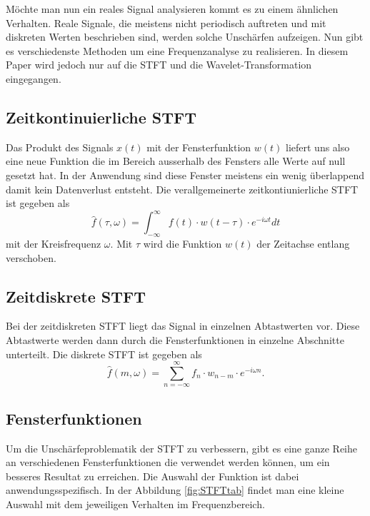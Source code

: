Möchte man nun ein reales Signal analysieren kommt es zu einem ähnlichen Verhalten. Reale Signale, die meistens nicht periodisch auftreten und mit diskreten Werten beschrieben sind, werden solche Unschärfen aufzeigen. Nun gibt es verschiedenste Methoden um eine Frequenzanalyse zu realisieren. In diesem Paper wird jedoch nur auf die STFT und die Wavelet-Transformation eingegangen. 


\subsection{Zeitkontinuierliche STFT}

Das Produkt des Signals $x(t)$ mit der Fensterfunktion $w(t) $ liefert uns also eine neue Funktion die im Bereich ausserhalb des Fensters alle Werte auf null gesetzt hat. In der Anwendung sind diese Fenster meistens ein wenig überlappend damit kein Datenverlust entsteht. Die verallgemeinerte zeitkontiunierliche STFT ist  gegeben als
\begin{equation}
	\hat{f}(\tau, \omega)=\int_{-\infty}^{\infty} f(t)\cdot w(t-\tau)\cdot e^{-i \omega t} dt
\end{equation}
mit der Kreisfrequenz  $\omega $. Mit $\tau$ wird die Funktion $w(t)$ der Zeitachse entlang verschoben.

\subsection{Zeitdiskrete STFT}
Bei der zeitdiskreten STFT liegt das Signal in einzelnen Abtastwerten vor. Diese Abtastwerte werden dann durch die Fensterfunktionen in einzelne Abschnitte unterteilt. Die diskrete STFT ist gegeben als
\begin{equation}
	\hat{f}(m, \omega)=\sum_{n=-\infty}^{\infty} f_{n} \cdot w_{n-m}\cdot e^{-i \omega n}.
\end{equation}


\subsection{Fensterfunktionen}
Um die Unschärfeproblematik der STFT zu verbessern, gibt es eine ganze Reihe an verschiedenen Fensterfunktionen die verwendet werden können, um ein besseres Resultat zu erreichen. Die Auswahl der Funktion ist dabei anwendungsspezifisch. In der Abbildung \ref{fig:STFTtab} findet man eine kleine Auswahl mit dem jeweiligen Verhalten im Frequenzbereich. 


